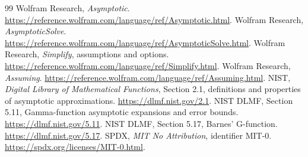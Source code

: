 \documentclass[11pt,a4paper]{article}
\begin{document}
\begin{thebibliography}{99}
 Wolfram Research, \emph{Asymptotic}. \url{https://reference.wolfram.com/language/ref/Asymptotic.html}.
 Wolfram Research, \emph{AsymptoticSolve}. \url{https://reference.wolfram.com/language/ref/AsymptoticSolve.html}.
 Wolfram Research, \emph{Simplify}, assumptions and options. \url{https://reference.wolfram.com/language/ref/Simplify.html}.
 Wolfram Research, \emph{Assuming}. \url{https://reference.wolfram.com/language/ref/Assuming.html}.
 NIST, \emph{Digital Library of Mathematical Functions}, Section 2.1, definitions and properties of asymptotic approximations. \url{https://dlmf.nist.gov/2.1}.
 NIST DLMF, Section 5.11, Gamma-function asymptotic expansions and error bounds. \url{https://dlmf.nist.gov/5.11}.
 NIST DLMF, Section 5.17, Barnes' G-function. \url{https://dlmf.nist.gov/5.17}.
 SPDX, \emph{MIT No Attribution}, identifier MIT-0. \url{https://spdx.org/licenses/MIT-0.html}.
\end{thebibliography}
\end{document}
